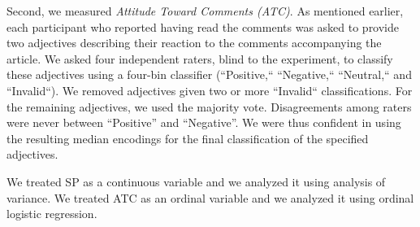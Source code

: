 Second, we measured {\it Attitude Toward Comments (ATC)}.  As mentioned earlier, each participant who reported having read the comments was asked to provide two adjectives describing their reaction to the comments accompanying the article.
We asked four independent raters, blind to the experiment, to classify these adjectives using a four-bin classifier (``Positive,`` ``Negative,`` ``Neutral,`` and ``Invalid``). %
We removed adjectives given two or more ``Invalid`` classifications. %
For the remaining adjectives, we used the majority vote.  Disagreements among raters were never between ``Positive'' and ``Negative''.  
We were thus confident in using the resulting median encodings for the final classification of the specified adjectives.

We treated SP as a continuous variable and we analyzed it using analysis of variance.
We treated ATC as an ordinal variable and we analyzed it using ordinal logistic regression.

